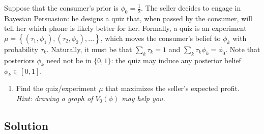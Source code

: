 \documentclass[a4paper]{article}
\newif\ifsolutions
\begin{document}
	Suppose that the consumer's prior is $\phi_0 = \frac{1}{2}$. The seller decides to engage in Bayesian Persuasion: he designs a quiz that, when passed by the consumer, will tell her which phone is likely better for her. Formally, a quiz is an experiment $\mu = \left\{ (\tau_1, \phi_1), (\tau_2, \phi_2), ... \right\}$, which moves the consumer's belief to $\phi_k$ with probability $\tau_k$. Naturally, it must be that $\sum_k \tau_k = 1$ and $\sum_k \tau_k \phi_k = \phi_0$. Note that posteriors $\phi_k$ need not be in $\{0,1\}$: the quiz may induce any posterior belief $\phi_k \in [0,1]$.
	\begin{enumerate}[resume]
		\item %
		Find the quiz/experiment $\mu$ that maximizes the seller's expected profit. \\%
		\emph{Hint: drawing a graph of $V_0(\phi)$ may help you.}
	\end{enumerate}
	
	
\ifsolutions
\subsection*{Solution}
	
\end{document}

